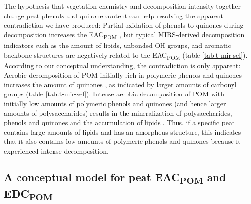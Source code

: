 \documentclass[draft,linenumbers]{agujournal2018}
\begin{document}
The hypothesis that vegetation chemistry and decomposition intensity
together change peat phenols and quinone content can help resolving the
apparent contradiction we have produced: Partial oxidation of phenols to
quinones during decomposition increases the EAC\textsubscript{POM}
\citep{Aeschbacher.2012, Walpen.2018, Tan.2017}, but typical
MIRS-derived decomposition indicators such as the amount of lipids,
unbonded OH groups, and aromatic backbone structures
\citep{Cocozza.2003, Artz.2008} are negatively related to the
EAC\textsubscript{POM} (table \ref{tab:t-mir-sel}). According to our
conceptual understanding, the contradiction is only apparent: Aerobic
decomposition of POM initially rich in polymeric phenols and quinones
increases the amount of quinones \citep{Aeschbacher.2012}, as indicated
by larger amounts of carbonyl groups (table \ref{tab:t-mir-sel}).
Intense aerobic decomposition of POM with initially low amounts of
polymeric phenols and quinones (and hence larger amounts of
polysaccharides) results in the mineralization of polysaccharides,
phenols and quinones and the accumulation of lipids
\citep{Fenner.2011, Leifeld.2012}. Thus, if a specific peat contains
large amounts of lipids and has an amorphous structure, this indicates
that it also contains low amounts of polymeric phenols and quinones
because it experienced intense decomposition.

\subsection{\texorpdfstring{A conceptual model for peat
EAC\textsubscript{POM} and
EDC\textsubscript{POM}}{A conceptual model for peat EAC and EDC}}
\end{document}
